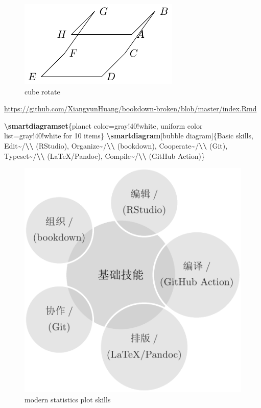 \documentclass[
]{book}
\newenvironment{Shaded}{\begin{snugshade}}{\end{snugshade}}
\newcommand{\FunctionTok}[1]{\textcolor[rgb]{0.13,0.29,0.53}{\textbf{#1}}}
\newcommand{\NormalTok}[1]{#1}
\theoremstyle{definition}
\theoremstyle{definition}
\theoremstyle{definition}
\theoremstyle{definition}
\theoremstyle{remark}
\begin{document}
\begin{figure}
\includegraphics[width=0.75\linewidth]{202401311000-TikZ_files/figure-latex/unnamed-chunk-65-1} \caption{cube rotate}\label{fig:unnamed-chunk-65}
\end{figure}

\url{https://github.com/XiangyunHuang/bookdown-broken/blob/master/index.Rmd}

\begin{Shaded}
\begin{Highlighting}[]
\FunctionTok{\textbackslash{}smartdiagramset}\NormalTok{\{planet color=gray!40!white, uniform color list=gray!40!white for 10 items\}}
\FunctionTok{\textbackslash{}smartdiagram}\NormalTok{[bubble diagram]\{Basic skills,}
\NormalTok{  Edit\textasciitilde{}/}\FunctionTok{\textbackslash{}\textbackslash{}}\NormalTok{ (RStudio), Organize\textasciitilde{}/}\FunctionTok{\textbackslash{}\textbackslash{}}\NormalTok{ (bookdown), Cooperate\textasciitilde{}/}\FunctionTok{\textbackslash{}\textbackslash{}}\NormalTok{ (Git), Typeset\textasciitilde{}/}\FunctionTok{\textbackslash{}\textbackslash{}}\NormalTok{ (LaTeX/Pandoc), Compile\textasciitilde{}/}\FunctionTok{\textbackslash{}\textbackslash{}}\NormalTok{ (GitHub Action)\}}
\end{Highlighting}
\end{Shaded}

\begin{figure}
\includegraphics[width=0.65\linewidth]{202401311000-TikZ_files/figure-latex/skills-1} \caption{modern statistics plot skills}\label{fig:skills}
\end{figure}
\end{document}
